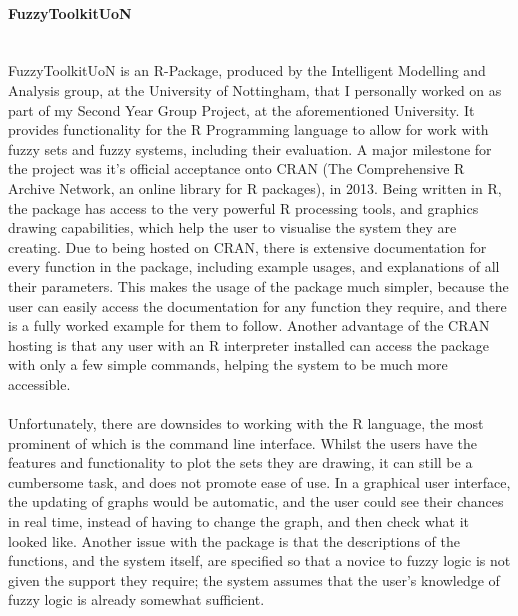 \paragraph{FuzzyToolkitUoN}\ \\
FuzzyToolkitUoN is an R-Package, produced by the Intelligent Modelling and Analysis group, at the University of Nottingham, that I personally worked on as part of my Second Year Group Project, at the aforementioned University. It provides functionality for the R Programming language to allow for work with fuzzy sets and fuzzy systems, including their evaluation. A major milestone for the project was it's official acceptance onto CRAN (The Comprehensive R Archive Network, an online library for R packages), in 2013. Being written in R, the package has access to the very powerful R processing tools, and graphics drawing capabilities, which help the user to visualise the system they are creating. Due to being hosted on CRAN, there is extensive documentation for every function in the package, including example usages, and explanations of all their parameters. This makes the usage of the package much simpler, because the user can easily access the documentation for any function they require, and there is a fully worked example for them to follow. Another advantage of the CRAN hosting is that any user with an R interpreter installed can access the package with only a few simple commands, helping the system to be much more accessible.\ \\
\ \\
Unfortunately, there are downsides to working with the R language, the most prominent of which is the command line interface. Whilst the users have the features and functionality to plot the sets they are drawing, it can still be a cumbersome task, and does not promote ease of use. In a graphical user interface, the updating of graphs would be automatic, and the user could see their chances in real time, instead of having to change the graph, and then check what it looked like. Another issue with the package is that the descriptions of the functions, and the system itself, are specified so that a novice to fuzzy logic is not given the support they require; the system assumes that the user's knowledge of fuzzy logic is already somewhat sufficient.

